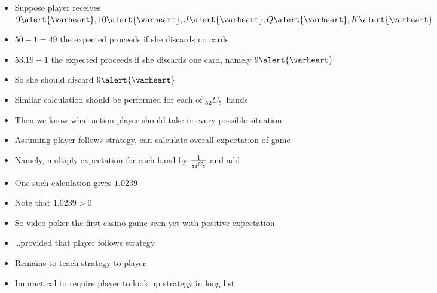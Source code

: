 \documentclass[handout,xcolor=dvipsnames]{beamer}
\theoremstyle{definition}
\newcommand\ncr[2]{\tensor[_{#1}]C{_{#2}}}
\newcommand{\hs}{\alert{\varheart}}
\begin{document}
\begin{frame}
\begin{example}
\begin{itemize}
\item Suppose player receives $9\hs,10\hs,J\hs,Q\hs,K\hs$
\item $50-1=49$ the expected proceeds if she discards no cards
\item $53.19-1$ the expected proceeds if she discards
one card, namely $9\hs$
\item So she should discard $9\hs$
\end{itemize}
\end{example}
\begin{itemize}
\item Similar calculation should be performed for each
of $\ncr{52}{5}$ hands
\item Then we know what action player should take in
every possible situation
\item Assuming player follows strategy, can calculate
overall expectation of game
\item Namely, multiply expectation for each hand by
$\frac{1}{\ncr{52}{5}}$ and add
\end{itemize}
\end{frame}

\begin{frame}
\begin{itemize}
\item One such calculation gives $1.0239$
\item Note that $1.0239>0$
\item So video poker the first casino game seen
yet with positive expectation
\item \dots provided that player follows strategy
\item Remains to teach strategy to player
\item Impractical to require player to look up strategy
in long list
\end{itemize}
\end{frame}
\end{document}
